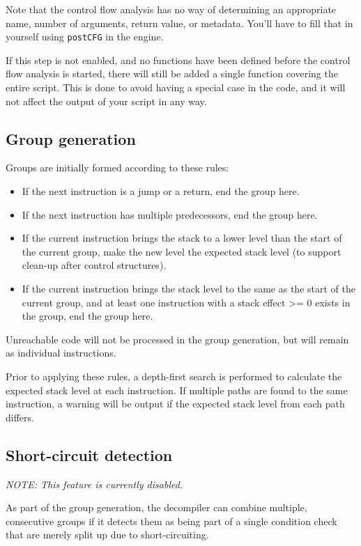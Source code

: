 Note that the control flow analysis has no way of determining an appropriate name, number of arguments, return value, or metadata. You'll have to fill that in yourself using \verb+postCFG+ in the engine.

If this step is not enabled, and no functions have been defined before the control flow analysis is started, there will still be added a single function covering the entire script. This is done to avoid having a special case in the code, and it will not affect the output of your script in any way.

\subsection{Group generation}
Groups are initially formed according to these rules:
\begin{itemize}
\item If the next instruction is a jump or a return, end the group here.
\item If the next instruction has multiple predecessors, end the group here.
\item If the current instruction brings the stack to a lower level than the start of the current group, make the new level the expected stack level (to support clean-up after control structures).
\item If the current instruction brings the stack level to the same as the start of the current group, and at least one instruction with a stack effect >= 0 exists in the group, end the group here.
\end{itemize}

Unreachable code will not be processed in the group generation, but will remain as individual instructions.

Prior to applying these rules, a depth-first search is performed to calculate the expected stack level at each instruction. If multiple paths are found to the same instruction, a warning will be output if the expected stack level from each path differs.

\subsection{Short-circuit detection}
\emph{NOTE: This feature is currently disabled.}

As part of the group generation, the decompiler can combine multiple, consecutive groups if it detects them as being part of a single condition check that are merely split up due to short-circuiting.

